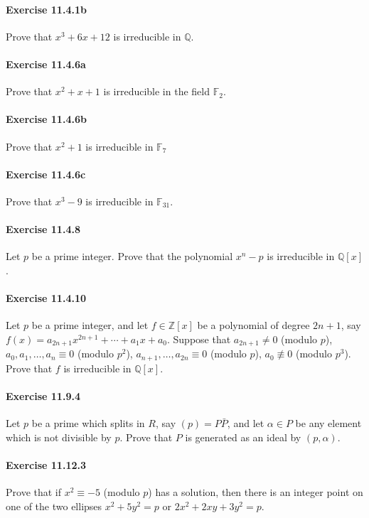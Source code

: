 \documentclass{article}
\begin{document}
\paragraph{Exercise 11.4.1b} Prove that $x^3 + 6x + 12$ is irreducible in $\mathbb{Q}$.

\paragraph{Exercise 11.4.6a} Prove that $x^2+x+1$ is irreducible in the field $\mathbb{F}_2$.

\paragraph{Exercise 11.4.6b} Prove that $x^2+1$ is irreducible in $\mathbb{F}_7$

\paragraph{Exercise 11.4.6c} Prove that $x^3 - 9$ is irreducible in $\mathbb{F}_{31}$.

\paragraph{Exercise 11.4.8} Let $p$ be a prime integer. Prove that the polynomial $x^n-p$ is irreducible in $\mathbb{Q}[x]$.

\paragraph{Exercise 11.4.10} Let $p$ be a prime integer, and let $f \in \mathbb{Z}[x]$ be a polynomial of degree $2 n+1$, say $f(x)=a_{2 n+1} x^{2 n+1}+\cdots+a_1 x+a_0$. Suppose that $a_{2 n+1} \neq 0$ (modulo $p$), $a_0, a_1, \ldots, a_n \equiv 0$ (modulo $p^2$), $a_{n+1}, \ldots, a_{2 n} \equiv 0$ (modulo $p$), $a_0 \not\equiv 0$ (modulo $p^3$). Prove that $f$ is irreducible in $\mathbb{Q}[x]$.

\paragraph{Exercise 11.9.4} Let $p$ be a prime which splits in $R$, say $(p)=P \bar{P}$, and let $\alpha \in P$ be any element which is not divisible by $p$. Prove that $P$ is generated as an ideal by $(p, \alpha)$.

\paragraph{Exercise 11.12.3} Prove that if $x^2 \equiv-5$ (modulo $p$) has a solution, then there is an integer point on one of the two ellipses $x^2+5 y^2=p$ or $2 x^2+2 x y+3 y^2=p$.
\end{document}
